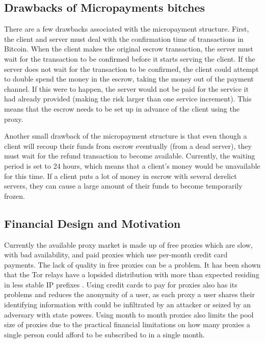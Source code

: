 \subsection{Drawbacks of Micropayments bitches}

There are a few drawbacks associated with the micropayment structure. First, 
the client and server must deal with the confirmation time of transactions in Bitcoin. When the client makes the original escrow transaction, the server must wait for the transaction to be confirmed before it starts serving the client. If the server does not wait for the transaction to be confirmed, the client could attempt to double spend the money in the escrow, taking the money out of the payment channel. If this were to happen, the server would not be paid for the service it had already provided (making the risk larger than one service increment). This means that the escrow needs to be set up in advance of the client using the proxy. 

Another small drawback of the micropayment structure is that even though a client will recoup their funds from escrow eventually (from a dead server), they must wait for the refund transaction to become available. Currently, the waiting period is set to 24 hours, which means that a client's money would be unavailable for this time. If a client puts a lot of money in escrow with several derelict servers, they can cause a large amount of their funds to become temporarily frozen.


\subsection{Financial Design and Motivation}

Currently the available proxy market is made up of free proxies which are slow, with bad availability, and paid proxies which use per-month credit card payments. The lack of quality in free proxies can be a problem. It has been shown that the Tor relays have a lopsided distribution with more than expected residing in less stable IP prefixes . Using credit cards to pay for proxies also has its problems and reduces the anonymity of a user, as each proxy a user shares their identifying information with could be infiltrated by an attacker or seized by an adversary with state powers. Using month to month proxies also limits the pool size of proxies due to the practical financial limitations on how many proxies a single person could afford to be subscribed to in a single month. 

